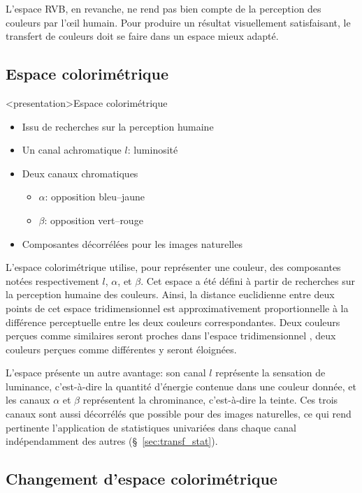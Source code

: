L'espace RVB, en revanche, ne rend pas bien compte de la perception des
couleurs par l'œil humain. Pour produire un résultat visuellement satisfaisant,
le transfert de couleurs doit se faire dans un espace mieux adapté.


\subsection{Espace colorimétrique \lAB}
\label{sec:espace_lab}

\begin{frame}<presentation>{Espace colorimétrique \lAB}
  \begin{itemize}
  \item Issu de recherches sur la perception humaine
  \item Un canal achromatique $l$: luminosité
  \item Deux canaux chromatiques
    \begin{itemize}
    \item $\alpha$: opposition bleu--jaune
    \item $\beta$: opposition vert--rouge
    \end{itemize}
  \item Composantes décorrélées pour les images naturelles
  \end{itemize}
\end{frame}

L'espace colorimétrique \lAB utilise, pour représenter une couleur, des
composantes notées respectivement $l$, $\alpha$, et $\beta$. Cet espace a été
défini à partir de recherches sur la perception humaine des couleurs. Ainsi, la
distance euclidienne entre deux points de cet espace tridimensionnel est
approximativement proportionnelle à la différence perceptuelle entre les deux
couleurs correspondantes. Deux couleurs perçues comme similaires seront proches
dans l'espace tridimensionnel \lAB, deux couleurs perçues comme différentes y
seront éloignées.

L'espace \lAB présente un autre avantage: son canal $l$ représente la sensation
de luminance, c'est-à-dire la quantité d'énergie contenue dans une couleur
donnée, et les canaux $\alpha$ et $\beta$ représentent la chrominance,
c'est-à-dire la \og{}teinte\fg{}. Ces trois canaux sont aussi décorrélés que
possible pour des images naturelles, ce qui rend pertinente l'application de
statistiques univariées dans chaque canal indépendamment des autres
(§~\ref{sec:transf_stat}).


\subsection{Changement d'espace colorimétrique}
\label{sec:changement_espace}

